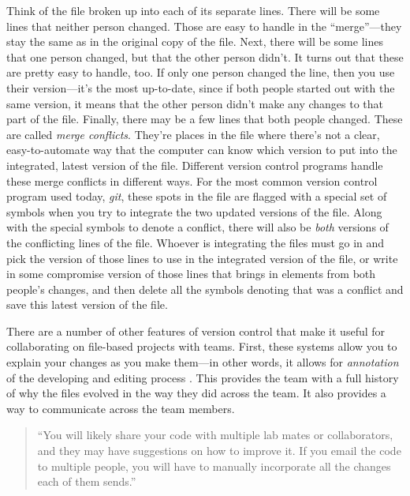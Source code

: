 \documentclass[]{tufte-book}
\begin{document}
Think of the file broken up into each of its separate lines. There will be some lines
that neither person changed. Those are easy to handle in the ``merge''---they stay the
same as in the original copy of the file. Next, there will be some lines that one
person changed, but that the other person didn't. It turns out that these are pretty
easy to handle, too. If only one person changed the line, then you use their version---it's
the most up-to-date, since if both people started out with the same version, it means
that the other person didn't make any changes to that part of the file.
Finally, there may be a few lines that both people changed. These are called \emph{merge conflicts}.
They're places in the file where there's not a clear, easy-to-automate way that
the computer can know which version to put into the integrated, latest version of the
file. Different version control programs handle these merge conflicts in different ways.
For the most common version control program used today, \emph{git}, these spots in the
file are flagged with a special set of symbols when you try to integrate the two updated
versions of the file. Along with the special symbols to denote a conflict, there will
also be \emph{both} versions of the conflicting lines of the file. Whoever is integrating the
files must go in and pick the version of those lines to use in the integrated version
of the file, or write in some compromise version of those lines that brings in elements
from both people's changes, and then delete all the symbols denoting that was a conflict
and save this latest version of the file.

There are a number of other features of version control that make it useful for
collaborating on file-based projects with teams. First, these systems allow you
to explain your changes as you make them---in other words, it allows for
\emph{annotation} of the developing and editing process \citep{raymondunderstanding}. This
provides the team with a full history of why the files evolved in the way they
did across the team. It also provides a way to communicate across the team
members.

\begin{quote}
``You will likely share your code with multiple lab mates or collaborators,
and they may have suggestions on how to improve it. If you email the code
to multiple people, you will have to manually incorporate all the changes
each of them sends.'' \citep{blischak2016quick}
\end{quote}
\end{document}
